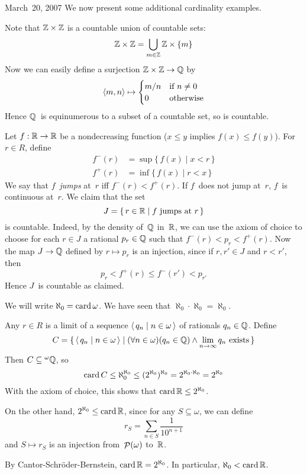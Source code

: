 \begin{lecture}{March~20, 2007}
We now present some additional cardinality examples.
\begin{example}
Note that \(\mathbb{Z}\times\mathbb{Z}\) is a countable union of countable sets:
\[\mathbb{Z}\times\mathbb{Z}=\bigcup_{m\in\mathbb{Z}}\mathbb{Z}\times\{m\}\]
Now we can easily define a surjection \(\mathbb{Z}\times\mathbb{Z}\to\mathbb{Q}\) by
\[\langle{m},{n}\rangle\mapsto
\begin{cases}
m/n&\text{if }n\ne0\\
0&\text{otherwise}
\end{cases}\]
Hence \(\mathbb{Q}\)~is equinumerous to a subset of a countable set, so is countable.
\end{example}
\begin{example}
Let \(f:\mathbb{R}\to\mathbb{R}\) be a nondecreasing function (\(x\le y\) implies \(f(x)\le f(y)\)). For \(r\in R\), define
\begin{align*}
f^-(r)&=\sup\{\,f(x)\mid x<r\,\}\\
f^+(r)&=\inf\{\,f(x)\mid r<x\,\}
\end{align*}
We say that \(f\)~\emph{jumps} at~\(r\) iff \(f^-(r)<f^+(r)\). If \(f\)~does not jump at~\(r\), \(f\)~is continuous at~\(r\). We claim that the set
\[J=\{\,r\in\mathbb{R}\mid f\text{ jumps at }r\,\}\]
is countable. Indeed, by the density of~\(\mathbb{Q}\) in~\(\mathbb{R}\), we can use the axiom of choice to choose for each \(r\in J\) a rational \(p_r\in\mathbb{Q}\) such that \(f^-(r)<p_r<f^+(r)\). Now the map \(J\to\mathbb{Q}\) defined by \(r\mapsto p_r\) is an injection, since if \(r,r'\in J\) and \(r<r'\), then
\[p_r<f^+(r)\le f^-(r')<p_{r'}\]
Hence \(J\)~is countable as claimed.
\end{example}
We will write \(\aleph_0=\operatorname{card}\omega\). We have seen that \(\aleph_0\cdot\aleph_0=\aleph_0\).
\begin{example}
Any \(r\in R\) is a limit of a sequence \(\langle\,{q_n}\mid{n\in\omega}\,\rangle\) of rationals \(q_n\in\mathbb{Q}\). Define
\[C=\{\,\langle\,{q_n}\mid{n\in\omega}\,\rangle\mid (\forall n\in\omega)(q_n\in\mathbb{Q})\land\lim_{n\to\infty}q_n\text{ exists}\,\}\]
Then \(C\subseteq{}^{\omega}{\mathbb{Q}}\), so
\[\operatorname{card} C\le\aleph_0^{\aleph_0}\le(2^{\aleph_0})^{\aleph_0}=2^{\aleph_0\cdot\aleph_0}=2^{\aleph_0}\]
With the axiom of choice, this shows that \(\operatorname{card}\mathbb{R}\le 2^{\aleph_0}\).

On the other hand, \(2^{\aleph_0}\le\operatorname{card}\mathbb{R}\), since for any \(S\subseteq\omega\), we can define
\[r_S=\sum_{n\in S}\frac{1}{10^{n+1}}\]
and \(S\mapsto r_S\) is an injection from~\(\mathop{\mathcal{P}}(\omega)\) to~\(\mathbb{R}\).

By Cantor-Schr\"oder-Bernstein, \(\operatorname{card}\mathbb{R}=2^{\aleph_0}\). In particular, \(\aleph_0<\operatorname{card}\mathbb{R}\).
\end{example}
\end{lecture}


